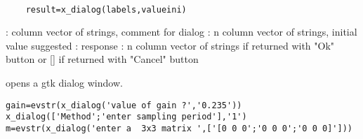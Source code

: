 
\begin{mandesc}
  \\ %
\end{mandesc}
\begin{calling_sequence}
  \begin{verbatim}
    result=x_dialog(labels,valueini)   
  \end{verbatim}
\end{calling_sequence}
\begin{parameters}
  \begin{varlist}
    : column vector of strings, comment for dialog
    : n column vector of strings, initial value suggested
    : response : n column vector of strings if returned with "Ok" button or [] if returned with "Cancel" button
  \end{varlist}
\end{parameters}
\begin{mandescription}
  opens a gtk dialog window.
\end{mandescription}
\begin{examples}
\begin{Verbatim}
gain=evstr(x_dialog('value of gain ?','0.235'))
x_dialog(['Method';'enter sampling period'],'1')
m=evstr(x_dialog('enter a  3x3 matrix ',['[0 0 0';'0 0 0';'0 0 0]']))
\end{Verbatim}
\end{examples}
\begin{manseealso}
       
\end{manseealso}

